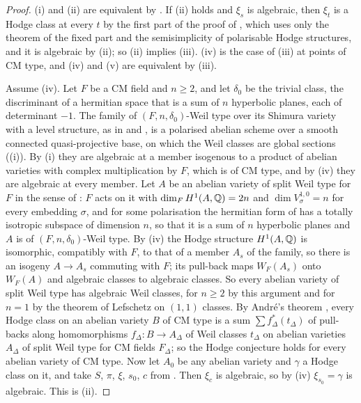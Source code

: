 \begin{proof}
(i) and (ii) are equivalent by . If (ii) holds and
$\xi_{s}$ is algebraic, then $\xi_{t}$ is a Hodge class at every $t$ by the
first part of the proof of , which uses only the theorem of
the fixed part and the semisimplicity of polarisable Hodge structures, and it
is algebraic by (ii); so (ii) implies (iii). (iv) is the case of (iii) at
points of CM type, and
(iv) and (v) are equivalent by (iii).

Assume (iv). Let $F$ be a CM field and $n\ge2$, and let $\delta_{0}$ be the
trivial class, the discriminant of a hermitian space that is a sum of $n$
hyperbolic planes, each of determinant $-1$. The family of
$(F,n,\delta_{0})$-Weil type over its Shimura variety with a level structure,
as in  and , is a polarised abelian
scheme over a smooth connected quasi-projective base, on which the Weil
classes are global sections ((i)). By (i)
they are algebraic at a member isogenous to a product of abelian varieties
with complex multiplication by $F$, which is of CM type, and by (iv) they are
algebraic at every member. Let $A$ be an abelian variety of split Weil type
for $F$ in the sense of \cite[\S2.1]{Mil20}: $F$ acts on it with
$\dim_{F}H^{1}(A,\mathbb{Q})=2n$ and $\dim V_{\sigma}^{1,0}=n$ for every embedding
$\sigma$, and for some polarisation the hermitian form of
 has a totally isotropic subspace of dimension $n$, so
that it is a sum of $n$ hyperbolic planes and $A$ is of
$(F,n,\delta_{0})$-Weil type. By (iv) the Hodge structure
$H^{1}(A,\mathbb{Q})$ is isomorphic, compatibly with $F$, to that of a member $A_{s}$
of the family, so there is an isogeny $A\to A_{s}$ commuting with $F$; its
pull-back maps $W_{F}(A_{s})$ onto $W_{F}(A)$ and algebraic classes to
algebraic classes. So every abelian variety of split Weil type has algebraic
Weil classes, for $n\ge2$ by this argument and for $n=1$ by the theorem of
Lefschetz on $(1,1)$ classes. By Andr\'e's theorem
\cite[Theorem~1 and its proof]{Mil20}, every Hodge class on an abelian
variety $B$ of CM type is a sum $\sum f_{\Delta}^{*}(t_{\Delta})$ of
pull-backs along homomorphisms $f_{\Delta}\colon B\to A_{\Delta}$ of Weil
classes $t_{\Delta}$ on abelian varieties $A_{\Delta}$ of split Weil type
for CM fields $F_{\Delta}$; so the Hodge conjecture holds for every abelian
variety of CM type. Now let $A_{0}$ be any abelian variety and $\gamma$ a
Hodge class on it, and take $S$, $\pi$, $\xi$, $s_{0}$, $c$ from
. Then $\xi_{c}$ is algebraic, so by (iv)
$\xi_{s_{0}}=\gamma$ is algebraic. This is (ii).
\end{proof}


